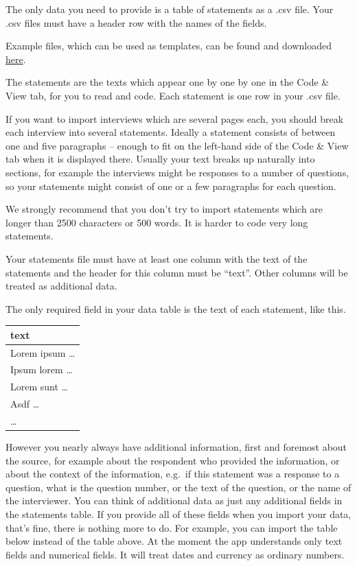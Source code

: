 \documentclass[
]{book}
\begin{document}
The only data you need to provide is a table of statements as a .csv file. Your .csv files must have a header row with the names of the fields.

Example files, which can be used as templates, can be found and downloaded \href{https://drive.google.com/drive/folders/1wvifDQ0BXmAjSudTRUv9i_4JURpphD4v}{here}.

The statements are the texts which appear one by one by one in the Code \& View tab, for you to read and code. Each statement is one row in your .csv file.

If you want to import interviews which are several pages each, you should break each interview into several statements. Ideally a statement consists of between one and five paragraphs -- enough to fit on the left-hand side of the Code \& View tab when it is displayed there. Usually your text breaks up naturally into sections, for example the interviews might be responses to a number of questions, so your statements might consist of one or a few paragraphs for each question.

We strongly recommend that you don't try to import statements which are longer than 2500 characters or 500 words. It is harder to code very long statements.

Your statements file must have at least one column with the text of the statements and the header for this column must be ``text''. Other columns will be treated as additional data.

The only required field in your data table is the text of each statement, like this.

\begin{longtable}[]{@{}l@{}}
\toprule
\textbf{text} \\
\midrule
\endhead
Lorem ipsum \ldots{} \\
Ipsum lorem \ldots{} \\
Lorem sunt \ldots{} \\
Asdf \ldots{} \\
\ldots{} \\
\bottomrule
\end{longtable}

However you nearly always have additional information, first and foremost about the source, for example about the respondent who provided the information, or about the context of the information, e.g.~if this statement was a response to a question, what is the question number, or the text of the question, or the name of the interviewer. You can think of additional data as just any additional fields in the statements table. If you provide all of these fields when you import your data, that's fine, there is nothing more to do. For example, you can import the table below instead of the table above. At the moment the app understands only text fields and numerical fields. It will treat dates and currency as ordinary numbers.
\end{document}
